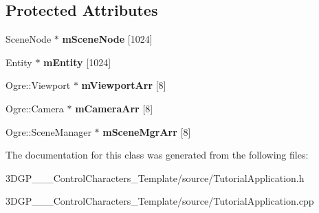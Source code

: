\subsection*{Protected Attributes}
\begin{DoxyCompactItemize}
\item 
\mbox{\label{class_basic_tutorial__00_a4ce11b746634fb2edeb80c145d91d842}} 
Scene\+Node $\ast$ {\bfseries m\+Scene\+Node} \mbox{[}1024\mbox{]}
\item 
\mbox{\label{class_basic_tutorial__00_a4457f00e95bd513d333a9abe6a0e8291}} 
Entity $\ast$ {\bfseries m\+Entity} \mbox{[}1024\mbox{]}
\item 
\mbox{\label{class_basic_tutorial__00_a6676a92b50e9b43634d4c66488537b73}} 
Ogre\+::\+Viewport $\ast$ {\bfseries m\+Viewport\+Arr} \mbox{[}8\mbox{]}
\item 
\mbox{\label{class_basic_tutorial__00_af8d457d912286a98c0975c52d4faf910}} 
Ogre\+::\+Camera $\ast$ {\bfseries m\+Camera\+Arr} \mbox{[}8\mbox{]}
\item 
\mbox{\label{class_basic_tutorial__00_a603779b6087698c57b7989e16d8a9b93}} 
Ogre\+::\+Scene\+Manager $\ast$ {\bfseries m\+Scene\+Mgr\+Arr} \mbox{[}8\mbox{]}
\end{DoxyCompactItemize}


The documentation for this class was generated from the following files\+:\begin{DoxyCompactItemize}
\item 
3\+D\+G\+P\+\_\+\_\+\_\+\+Control\+Characters\+\_\+\+Template/source/Tutorial\+Application.\+h\item 
3\+D\+G\+P\+\_\+\_\+\_\+\+Control\+Characters\+\_\+\+Template/source/Tutorial\+Application.\+cpp\end{DoxyCompactItemize}
